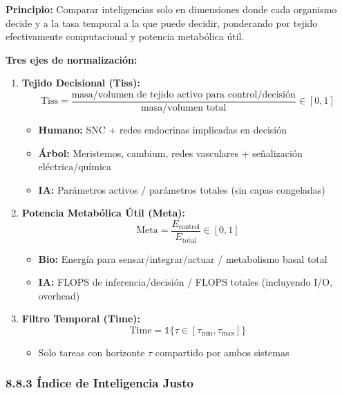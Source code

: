 \textbf{Principio:} Comparar inteligencias solo en dimensiones donde
cada organismo decide y a la tasa temporal a la que puede decidir,
ponderando por tejido efectivamente computacional y potencia metabólica
útil.

\textbf{Tres ejes de normalización:}

\begin{enumerate}
\def\labelenumi{\arabic{enumi}.}
\tightlist
\item
  \textbf{Tejido Decisional (Tiss):} \[
  \text{Tiss} = \frac{\text{masa/volumen de tejido activo para control/decisión}}{\text{masa/volumen total}} \in [0,1]
  \]

  \begin{itemize}
  \tightlist
  \item
    \textbf{Humano:} SNC + redes endocrinas implicadas en decisión
  \item
    \textbf{Árbol:} Meristemos, cambium, redes vasculares + señalización
    eléctrica/química
  \item
    \textbf{IA:} Parámetros activos / parámetros totales (sin capas
    congeladas)
  \end{itemize}
\item
  \textbf{Potencia Metabólica Útil (Meta):} \[
  \text{Meta} = \frac{E_{\text{control}}}{E_{\text{total}}} \in [0,1]
  \]

  \begin{itemize}
  \tightlist
  \item
    \textbf{Bio:} Energía para sensar/integrar/actuar / metabolismo
    basal total
  \item
    \textbf{IA:} FLOPS de inferencia/decisión / FLOPS totales
    (incluyendo I/O, overhead)
  \end{itemize}
\item
  \textbf{Filtro Temporal (Time):} \[
  \text{Time} = \mathbb{1}\{\tau \in [\tau_{\min}, \tau_{\max}]\}
  \]

  \begin{itemize}
  \tightlist
  \item
    Solo tareas con horizonte \(\tau\) compartido por ambos sistemas
  \end{itemize}
\end{enumerate}

\subsubsection{8.8.3 Índice de Inteligencia
Justo}\label{uxedndice-de-inteligencia-justo}

